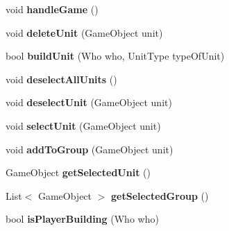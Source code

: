 \begin{DoxyCompactItemize}
\item 
\hypertarget{class_game_controller_ae1cb09c065288c83179440a8c7132672}{}void {\bfseries handle\+Game} ()\label{class_game_controller_ae1cb09c065288c83179440a8c7132672}

\item 
\hypertarget{class_game_controller_a6beec252fc2cf4bbeb8cec79d5174374}{}void {\bfseries delete\+Unit} (Game\+Object unit)\label{class_game_controller_a6beec252fc2cf4bbeb8cec79d5174374}

\item 
\hypertarget{class_game_controller_a1e8ba934d3e234307f50a3710f9c641a}{}bool {\bfseries build\+Unit} (Who who, Unit\+Type type\+Of\+Unit)\label{class_game_controller_a1e8ba934d3e234307f50a3710f9c641a}

\item 
\hypertarget{class_game_controller_a6969a4feb3cbc18212954e0bb7e2e3cd}{}void {\bfseries deselect\+All\+Units} ()\label{class_game_controller_a6969a4feb3cbc18212954e0bb7e2e3cd}

\item 
\hypertarget{class_game_controller_ae3722a2af86bf28e6152de6f9ed802c8}{}void {\bfseries deselect\+Unit} (Game\+Object unit)\label{class_game_controller_ae3722a2af86bf28e6152de6f9ed802c8}

\item 
\hypertarget{class_game_controller_a9a5e2e7359a2d77423644c92678154d2}{}void {\bfseries select\+Unit} (Game\+Object unit)\label{class_game_controller_a9a5e2e7359a2d77423644c92678154d2}

\item 
\hypertarget{class_game_controller_a4fb46a1b2d3b5132ef792f81db466586}{}void {\bfseries add\+To\+Group} (Game\+Object unit)\label{class_game_controller_a4fb46a1b2d3b5132ef792f81db466586}

\item 
\hypertarget{class_game_controller_ab1219cdc405982b5e9947e004fef207b}{}Game\+Object {\bfseries get\+Selected\+Unit} ()\label{class_game_controller_ab1219cdc405982b5e9947e004fef207b}

\item 
\hypertarget{class_game_controller_ab9fb961e72e2bd99bb3da82988143a23}{}List$<$ Game\+Object $>$ {\bfseries get\+Selected\+Group} ()\label{class_game_controller_ab9fb961e72e2bd99bb3da82988143a23}

\item 
\hypertarget{class_game_controller_afb78c694d4bb9eae40179cbaafee0da1}{}bool {\bfseries is\+Player\+Building} (Who who)\label{class_game_controller_afb78c694d4bb9eae40179cbaafee0da1}


\end{DoxyCompactItemize}
